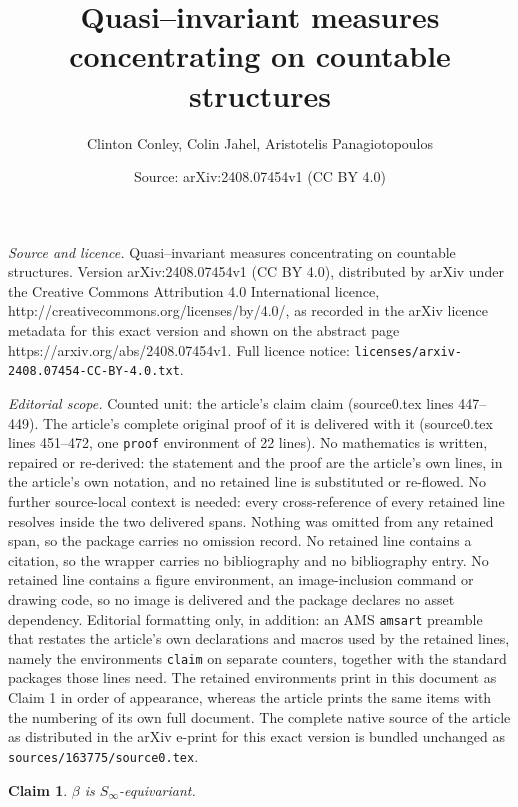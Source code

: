 \documentclass[10pt,a4paper]{amsart}
\title{Quasi--invariant measures concentrating on countable structures}
\author{Clinton Conley, Colin Jahel, Aristotelis Panagiotopoulos}
\date{Source: arXiv:2408.07454v1 (CC BY 4.0)}
\newtheorem{claim}{Claim}
\begin{document}
\maketitle

\noindent\emph{Source and licence.} Quasi--invariant measures concentrating on countable structures. Version arXiv:2408.07454v1 (CC BY 4.0), distributed by arXiv under the Creative Commons Attribution 4.0 International licence, http://creativecommons.org/licenses/by/4.0/, as recorded in the arXiv licence metadata for this exact version and shown on the abstract page https://arxiv.org/abs/2408.07454v1. Full licence notice: \texttt{licenses/arxiv-2408.07454-CC-BY-4.0.txt}.\par\smallskip

\noindent\textit{Editorial scope.} Counted unit: the article's claim claim (source0.tex lines 447--449). The article's complete original proof of it is delivered with it (source0.tex lines 451--472, one \texttt{proof} environment of 22 lines). No mathematics is written, repaired or re-derived: the statement and the proof are the article's own lines, in the article's own notation, and no retained line is substituted or re-flowed.  No further source-local context is needed: every cross-reference of every retained line resolves inside the two delivered spans.  Nothing was omitted from any retained span, so the package carries no omission record.  No retained line contains a citation, so the wrapper carries no bibliography and no bibliography entry.  No retained line contains a figure environment, an image-inclusion command or drawing code, so no image is delivered and the package declares no asset dependency.  Editorial formatting only, in addition: an AMS \texttt{amsart} preamble that restates the article's own declarations and macros used by the retained lines, namely the environments \texttt{claim} on separate counters, together with the standard packages those lines need.  The retained environments print in this document as Claim 1 in order of appearance, whereas the article prints the same items with the numbering of its own full document.  The complete native source of the article as distributed in the arXiv e-print for this exact version is bundled unchanged as \texttt{sources/163775/source0.tex}.
\begin{claim}
    $\beta$ is  $S_\infty$-equivariant.
\end{claim}
\end{document}
